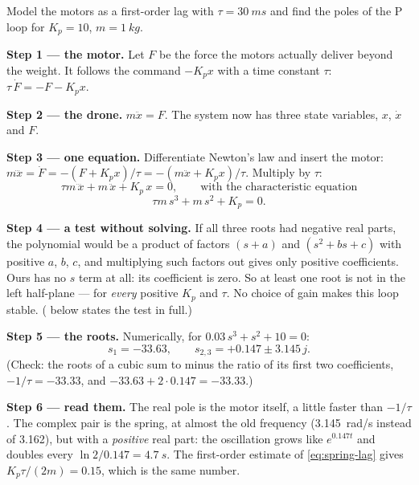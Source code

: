 \begin{example}
\label{ex:spring-cubic}
Model the motors as a first-order lag with $\tau = \SI{30}{ms}$ and find the poles of the P loop for $K_p = 10$, $m = \SI{1}{kg}$.

\textbf{Step 1 — the motor.} Let $F$ be the force the motors actually deliver beyond the weight. It follows the command $-K_p x$ with a time constant $\tau$: $\tau\,\dot F = -F - K_p x$.

\textbf{Step 2 — the drone.} $m\ddot x = F$. The system now has three state variables, $x$, $\dot x$ and $F$.

\textbf{Step 3 — one equation.} Differentiate Newton's law and insert the motor: $m\dddot x = \dot F = -(F + K_p x)/\tau = -(m\ddot x + K_p x)/\tau$. Multiply by $\tau$:
\begin{equation*}
  \tau m\,\dddot x + m\,\ddot x + K_p\,x = 0,
  \qquad\text{with the characteristic equation}
\end{equation*}
\begin{equation*}
  \tau m\,s^3 + m\,s^2 + K_p = 0 .
\end{equation*}

\textbf{Step 4 — a test without solving.} If all three roots had negative real parts, the polynomial would be a product of factors $(s + a)$ and $(s^2 + bs + c)$ with positive $a$, $b$, $c$, and multiplying such factors out gives only positive coefficients. Ours has no $s$ term at all: its coefficient is zero. So at least one root is not in the left half-plane — for \emph{every} positive $K_p$ and $\tau$. No choice of gain makes this loop stable. ( below states the test in full.)

\textbf{Step 5 — the roots.} Numerically, for $0.03\,s^3 + s^2 + 10 = 0$:
\begin{equation*}
  s_1 = -33.63, \qquad s_{2,3} = +0.147 \pm 3.145\,j .
\end{equation*}
(Check: the roots of a cubic sum to minus the ratio of its first two coefficients, $-1/\tau = -33.33$, and $-33.63 + 2\cdot0.147 = -33.33$.)

\textbf{Step 6 — read them.} The real pole is the motor itself, a little faster than $-1/\tau$. The complex pair is the spring, at almost the old frequency (\SI{3.145}{rad/s} instead of 3.162), but with a \emph{positive} real part: the oscillation grows like $e^{0.147t}$ and doubles every $\ln 2/0.147 = \SI{4.7}{s}$. The first-order estimate of \cref{eq:spring-lag} gives $K_p\tau/(2m) = 0.15$, which is the same number.
\end{example}

